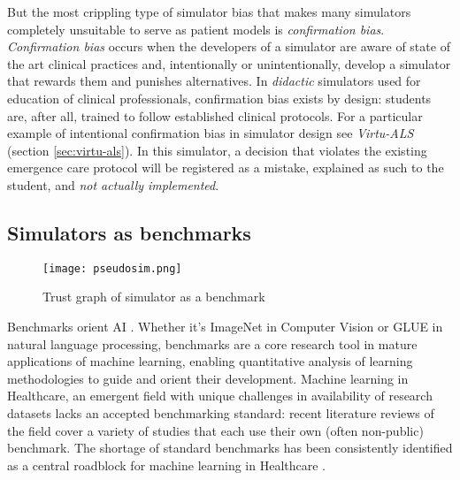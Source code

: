 But the most crippling type of simulator bias that makes many simulators completely unsuitable to serve as patient models is \emph{confirmation bias}.
\emph{Confirmation bias} occurs when the developers of a simulator are aware of state of the art clinical practices and, intentionally or unintentionally, develop a simulator that rewards them and punishes alternatives.
In \emph{didactic} simulators used for education of clinical professionals, confirmation bias exists by design: students are, after all, trained to follow established clinical protocols.
For a particular example of intentional confirmation bias in simulator design see \emph{Virtu-ALS} (section \ref{sec:virtu-als}).
In this simulator, a decision that violates the existing emergence care protocol will be registered as a mistake, explained as such to the student, and \emph{not actually implemented}.

\subsection{Simulators as benchmarks}

\begin{figure}
    \centering
    \texttt{[image: pseudosim.png]}
    \caption{Trust graph of simulator as a benchmark}
    \label{fig:benchmark}
\end{figure}

Benchmarks orient AI \cite{liangHolisticEvaluationLanguage2022}. Whether it's ImageNet \cite{dengImagenetLargescaleHierarchical2009} in Computer Vision or GLUE \cite{wangGLUEMultitaskBenchmark2018} in natural language processing, benchmarks are a core research tool in mature applications of machine learning, enabling quantitative analysis of learning methodologies to guide and orient their development.
Machine learning in Healthcare, an emergent field with unique challenges in availability of research datasets \cite{Anshik2021Handling,Gilbert2015market,Pahwa2021Big,Yazhini2019State} lacks an accepted benchmarking standard: recent literature reviews \cite{palMachineLearningHealthcare2023,tortorellaHealthcareTrendsChallenges2020} of the field cover a variety of studies that each use their own (often non-public) benchmark. The shortage of standard benchmarks has been consistently identified as a central roadblock for machine learning in Healthcare
\cite{Crown2015Potential,David2020Evaluating,guSupervisedLearningPervasive2023,harutyunyanMultitaskLearningBenchmarking2019,Kathrin2022Benchmark,mcdermottReproducibilityMachineLearning2021,purushothamBenchmarkingDeepLearning2018,S2017Benchmark}.

